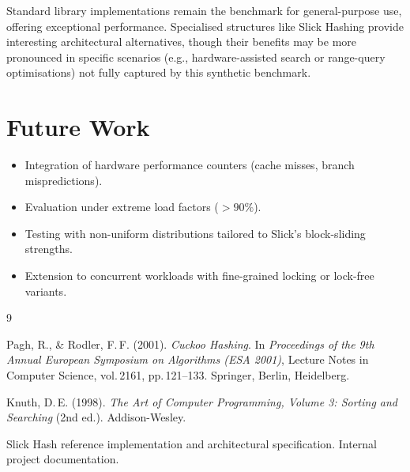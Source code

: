 \documentclass[11pt,a4paper]{article}
\begin{document}
Standard library implementations remain the benchmark for general-purpose use, offering exceptional performance. Specialised structures like Slick Hashing provide interesting architectural alternatives, though their benefits may be more pronounced in specific scenarios (e.g., hardware-assisted search or range-query optimisations) not fully captured by this synthetic benchmark.

\section{Future Work}

\begin{itemize}
  \item Integration of hardware performance counters (cache misses, branch mispredictions).
  \item Evaluation under extreme load factors ($>90\%$).
  \item Testing with non-uniform distributions tailored to Slick's block-sliding strengths.
  \item Extension to concurrent workloads with fine-grained locking or lock-free variants.
\end{itemize}

\begin{thebibliography}{9}

Pagh, R., \& Rodler, F.\,F. (2001).
\textit{Cuckoo Hashing}.
In \textit{Proceedings of the 9th Annual European Symposium on Algorithms (ESA 2001)}, Lecture Notes in Computer Science, vol.\,2161, pp.\,121--133. Springer, Berlin, Heidelberg.

Knuth, D.\,E. (1998).
\textit{The Art of Computer Programming, Volume 3: Sorting and Searching} (2nd ed.).
Addison-Wesley.

Slick Hash reference implementation and architectural specification.
Internal project documentation.

\end{thebibliography}
\end{document}
